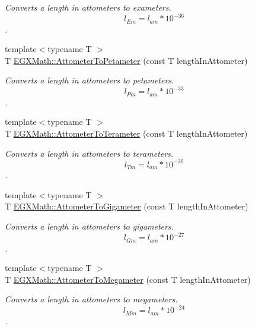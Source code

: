 \begin{DoxyCompactItemize}
\begin{DoxyCompactList}\small\item\em Converts a length in attometers to exameters. \[ l_{Em}=l_{am} * 10^{-36} \]. \end{DoxyCompactList}\item 
{\footnotesize template$<$typename T $>$ }\\T \mbox{\hyperlink{group___e_g_x_math-_conversions-_length_conversions-_s_i-_attometer-_s_i_ga780e4aa3b174598a72aefa3bdd960447}{E\+G\+X\+Math\+::\+Attometer\+To\+Petameter}} (const T length\+In\+Attometer)
\begin{DoxyCompactList}\small\item\em Converts a length in attometers to petameters. \[ l_{Pm}=l_{am} * 10^{-33} \]. \end{DoxyCompactList}\item 
{\footnotesize template$<$typename T $>$ }\\T \mbox{\hyperlink{group___e_g_x_math-_conversions-_length_conversions-_s_i-_attometer-_s_i_gac4d61e3aceb437ff7d52729ed4860f61}{E\+G\+X\+Math\+::\+Attometer\+To\+Terameter}} (const T length\+In\+Attometer)
\begin{DoxyCompactList}\small\item\em Converts a length in attometers to terameters. \[ l_{Tm}=l_{am} * 10^{-30} \]. \end{DoxyCompactList}\item 
{\footnotesize template$<$typename T $>$ }\\T \mbox{\hyperlink{group___e_g_x_math-_conversions-_length_conversions-_s_i-_attometer-_s_i_ga6d8498c20f3df80b922e6cb076c35fb8}{E\+G\+X\+Math\+::\+Attometer\+To\+Gigameter}} (const T length\+In\+Attometer)
\begin{DoxyCompactList}\small\item\em Converts a length in attometers to gigameters. \[ l_{Gm}=l_{am} * 10^{-27} \]. \end{DoxyCompactList}\item 
{\footnotesize template$<$typename T $>$ }\\T \mbox{\hyperlink{group___e_g_x_math-_conversions-_length_conversions-_s_i-_attometer-_s_i_gad381bcfa61a8521acea1c79f84750a5d}{E\+G\+X\+Math\+::\+Attometer\+To\+Megameter}} (const T length\+In\+Attometer)
\begin{DoxyCompactList}\small\item\em Converts a length in attometers to megameters. \[ l_{Mm}=l_{am} * 10^{-24} \]. \end{DoxyCompactList}\item 

\end{DoxyCompactItemize}
